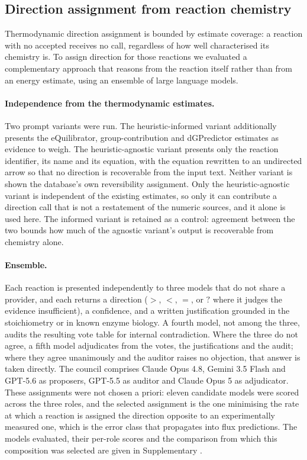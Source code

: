 \subsection{Direction assignment from reaction chemistry}\label{sec:methods-council}

Thermodynamic direction assignment is bounded by estimate coverage: a reaction
with no accepted \drG{} receives no call, regardless of how well characterised
its chemistry is. To assign direction for those reactions we evaluated a
complementary approach that reasons from the reaction itself rather than from
an energy estimate, using an ensemble of large language models.

\paragraph{Independence from the thermodynamic estimates.} Two prompt variants
were run. The heuristic-informed variant additionally presents the eQuilibrator,
group-contribution and dGPredictor estimates as evidence to weigh. The
heuristic-agnostic variant presents only the reaction identifier, its name and
its equation, with the equation rewritten to an undirected arrow so that no
direction is recoverable from the input text. Neither variant is shown the
database's own reversibility assignment. Only the heuristic-agnostic variant is
independent of the existing estimates, so only it can contribute a direction
call that is not a restatement of the numeric sources, and it alone is used
here. The informed variant is retained as a control: agreement between the two
bounds how much of the agnostic variant's output is recoverable from chemistry
alone.

\paragraph{Ensemble.} Each reaction is presented independently to three models
that do not share a provider, and each returns a direction
($>$, $<$, $=$, or $?$ where it judges the evidence insufficient), a confidence,
and a written justification grounded in the stoichiometry or in known enzyme
biology. A fourth model, not among the three, audits the resulting vote table
for internal contradiction. Where the three do not agree, a fifth model
adjudicates from the votes, the justifications and the audit; where they agree
unanimously and the auditor raises no objection, that answer is taken directly.
The council comprises Claude Opus 4.8, Gemini 3.5 Flash and GPT-5.6 as
proposers, GPT-5.5 as auditor and Claude Opus 5 as adjudicator. These
assignments were not chosen a priori: eleven candidate models were scored
across the three roles, and the selected assignment is the one minimising the
rate at which a reaction is assigned the direction opposite to an
experimentally measured one, which is the error class that propagates into
flux predictions. The models evaluated, their per-role scores and the
comparison from which this composition was selected are given in
Supplementary .

